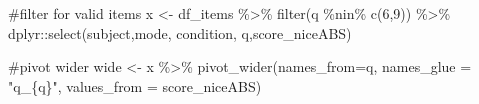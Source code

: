 \documentclass[
  letterpaper,
  DIV=11,
  numbers=noendperiod]{scrreprt}
\newenvironment{Shaded}{\begin{snugshade}}{\end{snugshade}}
\newcommand{\AttributeTok}[1]{\textcolor[rgb]{0.40,0.45,0.13}{#1}}
\newcommand{\CommentTok}[1]{\textcolor[rgb]{0.37,0.37,0.37}{#1}}
\newcommand{\DecValTok}[1]{\textcolor[rgb]{0.68,0.00,0.00}{#1}}
\newcommand{\FunctionTok}[1]{\textcolor[rgb]{0.28,0.35,0.67}{#1}}
\newcommand{\NormalTok}[1]{\textcolor[rgb]{0.00,0.23,0.31}{#1}}
\newcommand{\OtherTok}[1]{\textcolor[rgb]{0.00,0.23,0.31}{#1}}
\newcommand{\SpecialCharTok}[1]{\textcolor[rgb]{0.37,0.37,0.37}{#1}}
\newcommand{\StringTok}[1]{\textcolor[rgb]{0.13,0.47,0.30}{#1}}
\begin{document}
\begin{Shaded}
\begin{Highlighting}[]
\CommentTok{\#filter for valid items}
\NormalTok{x }\OtherTok{\textless{}{-}}\NormalTok{ df\_items }\SpecialCharTok{\%\textgreater{}\%} \FunctionTok{filter}\NormalTok{(q }\SpecialCharTok{\%nin\%} \FunctionTok{c}\NormalTok{(}\DecValTok{6}\NormalTok{,}\DecValTok{9}\NormalTok{)) }\SpecialCharTok{\%\textgreater{}\%}\NormalTok{ dplyr}\SpecialCharTok{::}\FunctionTok{select}\NormalTok{(subject,mode, condition, q,score\_niceABS) }

\CommentTok{\#pivot wider}
\NormalTok{wide }\OtherTok{\textless{}{-}}\NormalTok{ x }\SpecialCharTok{\%\textgreater{}\%} \FunctionTok{pivot\_wider}\NormalTok{(}\AttributeTok{names\_from=}\NormalTok{q, }\AttributeTok{names\_glue =} \StringTok{"q\_\{q\}"}\NormalTok{, }\AttributeTok{values\_from =}\NormalTok{ score\_niceABS)}


\end{Highlighting}
\end{Shaded}
\end{document}
